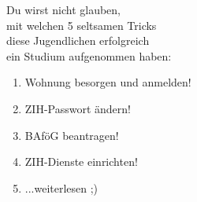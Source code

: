 
\hspace*{4em}Du wirst nicht glauben,\\
\hspace*{8em}mit welchen 5 seltsamen Tricks\\
\hspace*{12em}diese Jugendlichen erfolgreich\\
\hspace*{16em}ein Studium aufgenommen haben:\\[2em]

{
\LARGE
\hspace*{2cm}
\begin{enumerate}[label={\raisebox{.1cm}{\colorbox{gray!60}{\normalsize\textcolor{white}{\arabic*}}}}, itemsep=1cm, labelsep=.75cm, labelindent=.75cm, leftmargin=*]
  \item Wohnung besorgen und anmelden!
  \item ZIH-Passwort ändern!
  \item BAföG beantragen!
  \item ZIH-Dienste einrichten!
  \item ...weiterlesen ;)
\end{enumerate}
}

